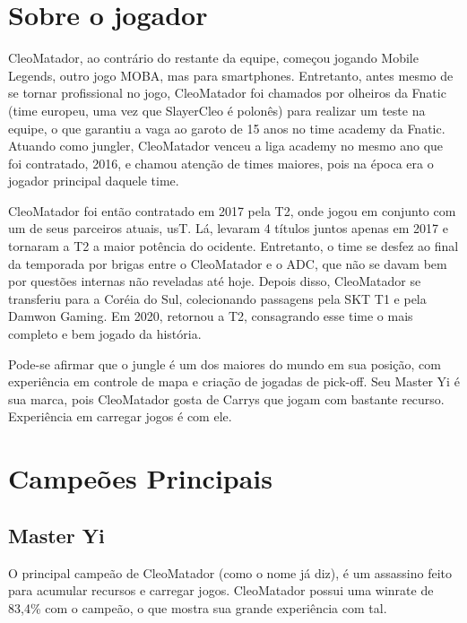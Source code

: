 \begin{multicols}{2}
	\section*{Sobre o jogador}
	CleoMatador, ao contrário do restante da equipe, começou jogando Mobile Legends, outro jogo MOBA, mas para smartphones. Entretanto, antes mesmo de se tornar profissional no jogo, CleoMatador foi chamados por olheiros da Fnatic (time europeu, uma vez que SlayerCleo é polonês) para realizar um teste na equipe, o que garantiu a vaga ao garoto de 15 anos no time academy da Fnatic. Atuando como jungler, CleoMatador venceu a liga academy no mesmo ano que foi contratado, 2016, e chamou atenção de times maiores, pois na época era o jogador principal daquele time. 
	
	CleoMatador foi então contratado em 2017 pela T2, onde jogou em conjunto com um de seus parceiros atuais, usT. Lá, levaram 4 títulos juntos apenas em 2017 e tornaram a T2 a maior potência do ocidente. Entretanto, o time se desfez ao final da temporada por brigas entre o CleoMatador e o ADC, que não se davam bem por questões internas não reveladas até hoje. Depois disso, CleoMatador se transferiu para a Coréia do Sul, colecionando passagens pela SKT T1 e pela Damwon Gaming. Em 2020, retornou a T2, consagrando esse time o mais completo e bem jogado da história.
	
	Pode-se afirmar que o jungle é um dos maiores do mundo em sua posição, com experiência em controle de mapa e criação de jogadas de pick-off. Seu Master Yi é sua marca, pois CleoMatador gosta de Carrys que jogam com bastante recurso. Experiência em carregar jogos é com ele.
	
	\section*{Campeões Principais}
	\subsection*{Master Yi}
	O principal campeão de CleoMatador (como o nome já diz), é um assassino feito para acumular recursos e carregar jogos. CleoMatador possui uma winrate de 83,4\% com o campeão, o que mostra sua grande experiência com tal.
	

\end{multicols}
